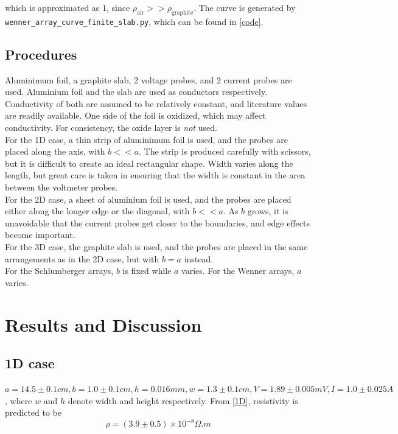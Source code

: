 \documentclass[12pt]{IEEEtran}
\begin{document}
which is approximated as 1, since $\rho_{\text{air}} >> \rho_{\text{graphite}}$. The curve is generated by \verb|wenner_array_curve_finite_slab.py|, which can be found in \ref{code}.

\subsection{Procedures}

Aluminimum foil, a graphite slab, 2 voltage probes, and 2 current probes are used. Aluminium foil and the slab are used as conductors respectively. Conductivity of both are assumed to be relatively constant, and literature values are readily available. One side of the foil is oxidized, which may affect conductivity. For consistency, the oxide layer is \textit{not} used. \\
For the 1D case, a thin strip of aluminimum foil is used, and the probes are placed along the axis, with $b << a$. The strip is produced carefully with scissors, but it is difficult to create an ideal rectangular shape. Width varies along the length, but great care is taken in ensuring that the width is constant in the area between the voltmeter probes. \\
For the 2D case, a sheet of aluminium foil is used, and the probes are placed either along the longer edge or the diagonal, with $b << a$. As $b$ grows, it is unavoidable that the current probes get closer to the boundaries, and edge effects become important. \\
For the 3D case, the graphite slab is used, and the probes are placed in the same arrangements as in the 2D case, but with $b = a$ instead. \\
For the Schlumberger arrays, $b$ is fixed while $a$ varies. For the Wenner arrays, $a$ varies.

\section{Results and Discussion} 

\subsection{1D case}

$a = 14.5 \pm 0.1\unit{cm}, b = 1.0 \pm 0.1\unit{cm}, h = 0.016 \unit{mm}, w = 1.3 \pm 0.1\unit{cm}, V = 1.89 \pm 0.005 \unit{mV}, I = 1.0 \pm 0.025 \unit{A}$, where $w$ and $h$ denote width and height respectively. From \ref{1D}, resistivity is predicted to be
$$\rho = (3.9 \pm 0.5) \times 10^{-8} \unit{\Omega.m}$$
\end{document}
